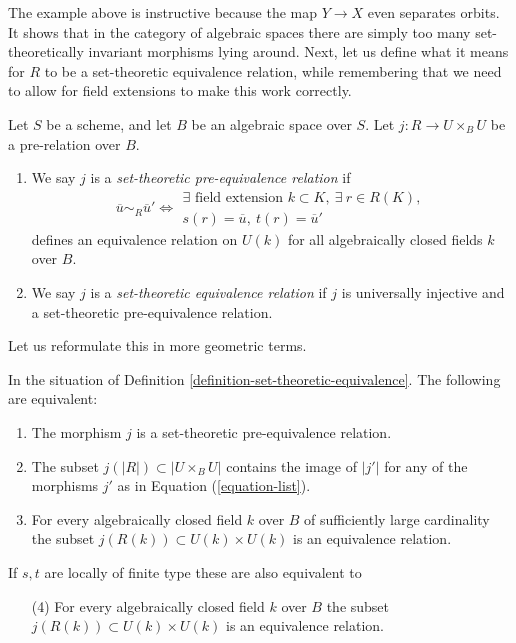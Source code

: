 \noindent
The example above is instructive because the map $Y \to X$ even separates
orbits. It shows that in the category of algebraic spaces there are simply
too many set-theoretically invariant morphisms lying around. Next, let us
define what it means for $R$ to be a set-theoretic equivalence relation, while
remembering that we need to allow for field extensions to make this work
correctly.

\begin{definition}
\label{definition-set-theoretic-equivalence}
Let $S$ be a scheme, and let $B$ be an algebraic space over $S$.
Let $j : R \to U \times_B U$ be a pre-relation over $B$.
\begin{enumerate}
\item We say $j$ is a {\it set-theoretic pre-equivalence relation} if
$$
\overline{u} \sim_R \overline{u}'
\Leftrightarrow
\begin{matrix}
\exists\text{ field extension }k \subset K, \ \exists\ r \in R(K),\\
s(r) = \overline{u}, \ t(r) = \overline{u}'
\end{matrix}
$$
defines an equivalence relation on $U(k)$ for all algebraically closed fields
$k$ over $B$.
\item We say $j$ is a {\it set-theoretic equivalence relation}
if $j$ is universally injective and a set-theoretic pre-equivalence
relation.
\end{enumerate}
\end{definition}

\noindent
Let us reformulate this in more geometric terms.

\begin{lemma}
\label{lemma-set-theoretic-pre-equivalence-geometric}
In the situation of Definition \ref{definition-set-theoretic-equivalence}.
The following are equivalent:
\begin{enumerate}
\item The morphism $j$ is a set-theoretic pre-equivalence relation.
\item The subset $j(|R|) \subset |U \times_B U|$ contains the image of
$|j'|$ for any of the morphisms $j'$ as in Equation (\ref{equation-list}).
\item For every algebraically closed field $k$ over $B$ of sufficiently large
cardinality the subset $j(R(k)) \subset U(k) \times U(k)$ is an equivalence
relation.
\end{enumerate}
If $s, t$ are locally of finite type these are also equivalent to
\begin{enumerate}
\item[(4)] For every algebraically closed field $k$ over $B$
the subset $j(R(k)) \subset U(k) \times U(k)$ is an equivalence relation.
\end{enumerate}
\end{lemma}

